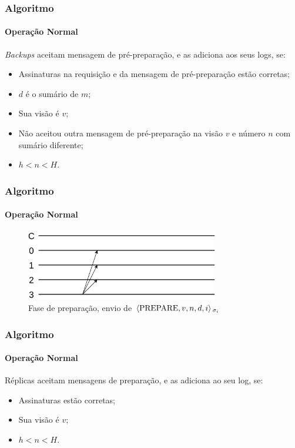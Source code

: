 \documentclass{beamer}
\begin{document}
\begin{frame}
  \frametitle{Algoritmo}
  \framesubtitle{Operação Normal}

  \textit{Backups} aceitam mensagem de pré-preparação, e as adiciona aos seus logs, se:
  \begin{itemize}
    \item
      Assinaturas na requisição e da mensagem de pré-preparação estão corretas;
      
    \item
      $d$ é o sumário de $m$;

    \item
      Sua visão é $v$;

    \item
      Não aceitou outra mensagem de pré-preparação na visão $v$ e número $n$ com sumário diferente;

    \item
      $h < n < H$.
  \end{itemize}
\end{frame}

\begin{frame}
  \frametitle{Algoritmo}
  \framesubtitle{Operação Normal}

  \begin{figure}
    \includegraphics[width=0.75\textwidth]{images/prepare}
    \caption{Fase de preparação, envio de $\braket{\text{PREPARE}, v, n, d, i}{}_{\sigma_i}$}
  \end{figure}
\end{frame}

\begin{frame}
  \frametitle{Algoritmo}
  \framesubtitle{Operação Normal}

  Réplicas aceitam mensagens de preparação, e as adiciona ao seu log, se:
  \begin{itemize}
    \item
      Assinaturas estão corretas;

    \item
      Sua visão é $v$;

    \item
      $h < n < H$.
  \end{itemize}
\end{frame}
\end{document}
